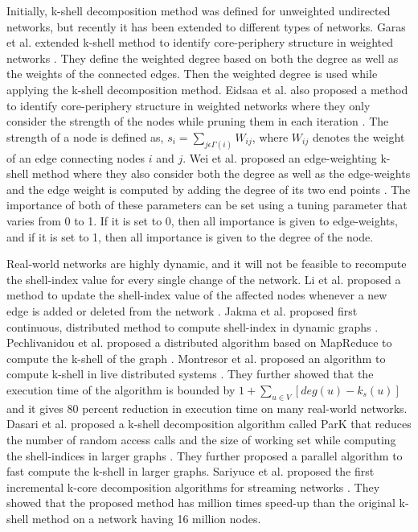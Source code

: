 \documentclass[conference]{IEEEtran}
\begin{document}
Initially, k-shell decomposition method was defined for unweighted undirected networks, but recently it has been extended to different types of networks. Garas et al. extended k-shell method to identify core-periphery structure in weighted networks \cite{garas2012k}. They define the weighted degree based on both the degree as well as the weights of the connected edges. Then the weighted degree is used while applying the k-shell decomposition method. Eidsaa et al. also proposed a method to identify core-periphery structure in weighted networks where they only consider the strength of the nodes while pruning them in each iteration \cite{eidsaa2013s}. The strength of a node is defined as, $s_i=\sum_{j \epsilon \Gamma (i)} W_{ij}$, where $W_{ij}$ denotes the weight of an edge connecting nodes $i$ and $j$. Wei et al. proposed an edge-weighting k-shell method where they also consider both the degree as well as the edge-weights and the edge weight is computed by adding the degree of its two end points \cite{wei2015weighted}. The importance of both of these parameters can be set using a tuning parameter that varies from 0 to 1. If it is set to 0, then all importance is given to edge-weights, and if it is set to 1, then all importance is given to the degree of the node.

Real-world networks are highly dynamic, and it will not be feasible to recompute the shell-index value for every single change of the network. Li et al. proposed a method to update the shell-index value of the affected nodes whenever a new edge is added or deleted from the network \cite{li2014efficient}. Jakma et al. proposed first continuous, distributed method to compute shell-index in dynamic graphs \cite{jakma2012distributed}. Pechlivanidou et al. proposed a distributed algorithm based on MapReduce to compute the k-shell of the graph \cite{pechlivanidou2014mapreduce}. Montresor et al. proposed an algorithm to compute k-shell in live distributed systems \cite{montresor2013distributed}. They further showed that the execution time of the algorithm is bounded by $1+\sum_{u \in V}[deg(u)-k_s(u)]$ and it gives 80 percent reduction in execution time on many real-world networks. Dasari et al. proposed a k-shell decomposition algorithm called ParK that reduces the number of random access calls and the size of working set while computing the shell-indices in larger graphs \cite{dasari2014park}. They further proposed a parallel algorithm to fast compute the k-shell in larger graphs. Sariyuce et al. proposed the first incremental k-core decomposition algorithms for streaming networks \cite{sariyuce2013streaming}. They showed that the proposed method has million times speed-up than the original k-shell method on a network having 16 million nodes.
\end{document}
